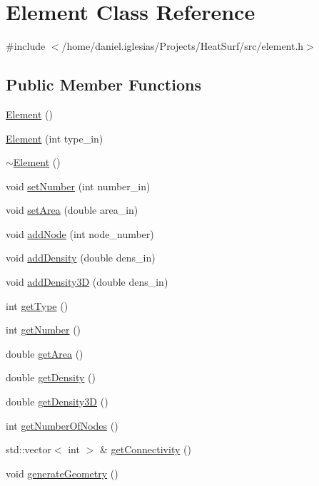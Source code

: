 \hypertarget{classElement}{\section{Element Class Reference}
\label{classElement}
}


{\ttfamily \#include $<$/home/daniel.\-iglesias/\-Projects/\-Heat\-Surf/src/element.\-h$>$}

\subsection*{Public Member Functions}
\begin{DoxyCompactItemize}
\item 
\hyperlink{classElement_ab0d0e20be9a36ae676202db753faeec9}{Element} ()
\item 
\hyperlink{classElement_a4e6e261243d3b4580ae7b4c266d5ce5f}{Element} (int type\-\_\-in)
\item 
\hyperlink{classElement_a13d54ba9c08b6bec651402f1c2bb002c}{$\sim$\-Element} ()
\item 
void \hyperlink{classElement_ac9e6cfa50bdbdbe7fa8895fec7490c89}{set\-Number} (int number\-\_\-in)
\item 
void \hyperlink{classElement_abf8a7a490cad2431443286d7ee615aa7}{set\-Area} (double area\-\_\-in)
\item 
void \hyperlink{classElement_aa838e2bc18a65fffaa3a74da5767650c}{add\-Node} (int node\-\_\-number)
\item 
void \hyperlink{classElement_a0fcde2c599efe04b0a04623b362972fc}{add\-Density} (double dens\-\_\-in)
\item 
void \hyperlink{classElement_a9101c3a58134bb2fd736429976727e79}{add\-Density3\-D} (double dens\-\_\-in)
\item 
int \hyperlink{classElement_a8bd9315dc4eb7b59f47410347375bf0e}{get\-Type} ()
\item 
int \hyperlink{classElement_a8de2b9d656140b6178581da489edf199}{get\-Number} ()
\item 
double \hyperlink{classElement_a227a96bf84d82893af37a14650561eee}{get\-Area} ()
\item 
double \hyperlink{classElement_a171ad7737d0015969b05cd21a17ec078}{get\-Density} ()
\item 
double \hyperlink{classElement_ac53449729ec1381c44958bcf6ae7a797}{get\-Density3\-D} ()
\item 
int \hyperlink{classElement_a54738e08d76563f2ffb5b6aef0f38981}{get\-Number\-Of\-Nodes} ()
\item 
std\-::vector$<$ int $>$ \& \hyperlink{classElement_ac6df9864bc31d99d8942e7c85533e9aa}{get\-Connectivity} ()
\item 
void \hyperlink{classElement_abd3cfd73fd15f802578207411d2740bb}{generate\-Geometry} ()
\end{DoxyCompactItemize}
